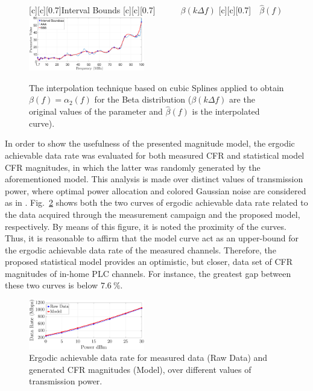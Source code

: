 \documentclass[journal]{IEEEtran}
\begin{document}
\begin{figure}[h!]
	\centering
	[c][0.7]{Interval Bounds}
	[c][0.7]{~~~~~~$\beta(k \Delta f)$}
	[c][0.7]{~~$\hat{\beta}(f)$}
	\includegraphics[width=0.45\textwidth]{images/Beta_fit_1.7.eps}
	\caption{The interpolation technique based on cubic Splines applied to obtain $\beta(f) = \alpha_2(f)$ for the Beta distribution ($\beta(k \Delta f)$ are the original values of the parameter and $\hat{\beta}(f)$ is the interpolated curve).}
	\label{Fit_beta}
\end{figure}

In order to show the usefulness of the presented magnitude model, the ergodic achievable data rate was evaluated for both measured \ac{CFR} and statistical model \ac{CFR} magnitudes, in which the latter was randomly generated by the aforementioned model. This analysis is made over distinct values of transmission power, where optimal power allocation and colored Gaussian noise are considered as in \cite{Victor2017}. Fig.~\ref{Cap_PLC} shows both the two curves of ergodic achievable data rate related to the data acquired through the measurement campaign and the proposed model, respectively. By means of this figure, it is noted the proximity of the curves. Thus, it is reasonable to affirm that the model curve act as an upper-bound for the ergodic achievable data rate of the measured channels. Therefore, the proposed statistical model provides an optimistic, but closer, data set of \ac{CFR} magnitudes of in-home \ac{PLC} channels. For instance, the greatest gap between these two curves is below $7.6~\%$.

\begin{figure}[h]
	\centering
	\includegraphics[width=0.45\textwidth]{images/Capacidade.eps}
	\caption{Ergodic achievable data rate for measured data (Raw Data) and generated CFR magnitudes (Model), over different values of transmission power.}
	\label{Cap_PLC}
\end{figure}
\end{document}
